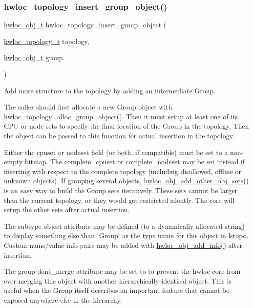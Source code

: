 \subsubsection{\texorpdfstring{hwloc\+\_\+topology\+\_\+insert\+\_\+group\+\_\+object()}{hwloc\_topology\_insert\_group\_object()}}
{\footnotesize\ttfamily \hyperlink{a00185_ga79b8ab56877ef99ac59b833203391c7d}{hwloc\+\_\+obj\+\_\+t} hwloc\+\_\+topology\+\_\+insert\+\_\+group\+\_\+object (\begin{DoxyParamCaption}\item[{\hyperlink{a00186_ga9d1e76ee15a7dee158b786c30b6a6e38}{hwloc\+\_\+topology\+\_\+t}}]{topology,  }\item[{\hyperlink{a00185_ga79b8ab56877ef99ac59b833203391c7d}{hwloc\+\_\+obj\+\_\+t}}]{group }\end{DoxyParamCaption})}



Add more structure to the topology by adding an intermediate Group. 

The caller should first allocate a new Group object with \hyperlink{a00194_ga4cea4741165faf5323931a9ed8786ef7}{hwloc\+\_\+topology\+\_\+alloc\+\_\+group\+\_\+object()}. Then it must setup at least one of its C\+PU or node sets to specify the final location of the Group in the topology. Then the object can be passed to this function for actual insertion in the topology.

Either the cpuset or nodeset field (or both, if compatible) must be set to a non-\/empty bitmap. The complete\+\_\+cpuset or complete\+\_\+nodeset may be set instead if inserting with respect to the complete topology (including disallowed, offline or unknown objects). If grouping several objects, \hyperlink{a00194_gad458715d3335df44849216cc123d1055}{hwloc\+\_\+obj\+\_\+add\+\_\+other\+\_\+obj\+\_\+sets()} is an easy way to build the Group sets iteratively. These sets cannot be larger than the current topology, or they would get restricted silently. The core will setup the other sets after actual insertion.

The {\ttfamily subtype} object attribute may be defined (to a dynamically allocated string) to display something else than \char`\"{}\+Group\char`\"{} as the type name for this object in lstopo. Custom name/value info pairs may be added with \hyperlink{a00189_gace7654bb8a9002caae1a4b8a59e7452e}{hwloc\+\_\+obj\+\_\+add\+\_\+info()} after insertion.

The group {\ttfamily dont\+\_\+merge} attribute may be set to {} to prevent the hwloc core from ever merging this object with another hierarchically-\/identical object. This is useful when the Group itself describes an important feature that cannot be exposed anywhere else in the hierarchy.

